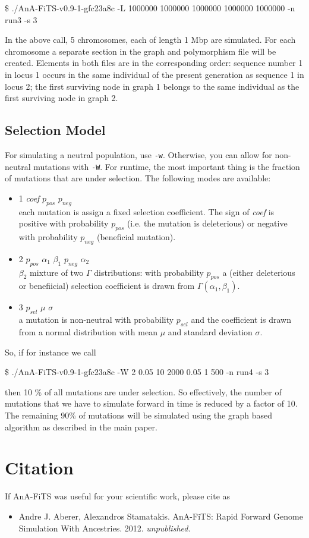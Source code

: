 \documentclass{scrartcl}
\begin{document}
\$ ./AnA-FiTS-v0.9-1-gfc23a8c -L 1000000 1000000 1000000 1000000 1000000   -n run3 -s 3

In the above call, 5 chromosomes, each of length 1 Mbp are
simulated. For each chromosome a separate section in the graph and
polymorphism file will be created. Elements in both files are in the
corresponding order: sequence number 1 in locus 1 occurs in the same
individual of the present generation as sequence 1 in locus 2; the
first surviving node in graph 1 belongs to the same individual as the
first surviving node in graph 2.

\subsection{Selection Model}
\label{sec:selection-model}

For simulating a neutral population, use \texttt{-w}. Otherwise, you
can allow for non-neutral mutations with \texttt{-W}. For runtime, the
most important thing is the fraction of mutations that are under
selection. The following modes are available: 

\begin{itemize}
\item 1 \textit{coef} $p_{pos}$ $p_{neg}$ \\
  each mutation is assign a fixed selection coefficient. The sign of
  \textit{coef} is positive with probability $p_{pos}$ (i.e. the
  mutation is deleterious) or negative with probability $p_{neg}$
  (beneficial mutation).
\item 2 $p_{pos}$ $\alpha_{1}$ $\beta_1$ $p_{neg}$ $\alpha_2$ \\
  $\beta_2$ mixture of two $\Gamma$ distributions: with probability
  $p_{pos}$ a (either deleterious or benefiicial) selection
  coefficient is drawn from $\Gamma(\alpha_1,\beta_1 )$.
\item 3  $p_{sel}$ $\mu$ $\sigma$ \\ 
  a mutation is non-neutral with probability $p_{sel}$ and the
  coefficient is drawn from a normal distribution with mean $\mu$ and
  standard deviation $\sigma$.
\end{itemize}

\noindent So, if for instance we call 

\$ ./AnA-FiTS-v0.9-1-gfc23a8c -W 2 0.05 10 2000 0.05 1 500 -n run4 -s 3

then 10 \% of all mutations are under selection. So effectively, the
number of mutations that we have to simulate forward in time is
reduced by a factor of 10. The remaining 90\% of mutations will be
simulated using the graph based algorithm as described in the main
paper. 

 
\section{Citation}
\label{sec:citation}

If AnA-FiTS was useful for your scientific work, please cite as 

\begin{itemize}
\item Andre J. Aberer, Alexandros Stamatakis. AnA-FiTS: Rapid Forward
  Genome Simulation With Ancestries. 2012. \textit{unpublished.}
\end{itemize}
\end{document}

